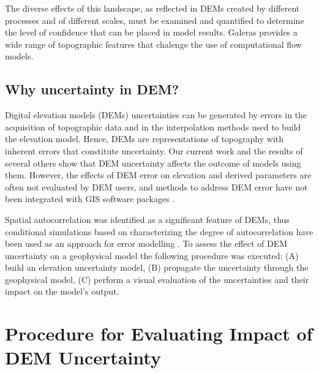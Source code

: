 \documentclass[a4paper,fleqn]{article}
\begin{document}
 The diverse
effects of this landscape, as reflected in DEMs created by different
processes and of different scales, must be examined and quantified to
determine the level of confidence that can be placed in model
results. Galeras provides a wide range of topographic features that chalenge the use of computational flow models.


\subsection{Why uncertainty in DEM?}

 Digital elevation models (DEMs) uncertainties can be
generated by errors in the acquisition of topographic data and in the
interpolation methods used to build the elevation model. Hence, DEMs are representations of topography with
inherent errors that constitute uncertainty. Our current work
\citep{stefanescu1, stefanescu2} and the results of several others
\citep{Felix_Hebeler} show that DEM uncertainty affects the outcome
of models using them. However, the effects of DEM error on elevation
and derived parameters are often not evaluated by DEM users, and
methods to address DEM error have not been integrated with GIS
software packages \citep{Wechsler2006}. 

Spatial autocorrelation was identified as a significant feature of
DEMs, thus conditional simulations based on characterizing the degree
of autocorrelation have been used as an approach for error modelling
\citep{Goodchild_1992}.  To assess the effect of DEM uncertainty on a
geophysical model the following procedure was executed: (A) build an
elevation uncertainty model, (B) propagate the uncertainty through the
geophysical model, (C) perform a visual evaluation of the
uncertainties and their impact on the model's output.

\section{Procedure for Evaluating Impact of  DEM Uncertainty }
\end{document}
